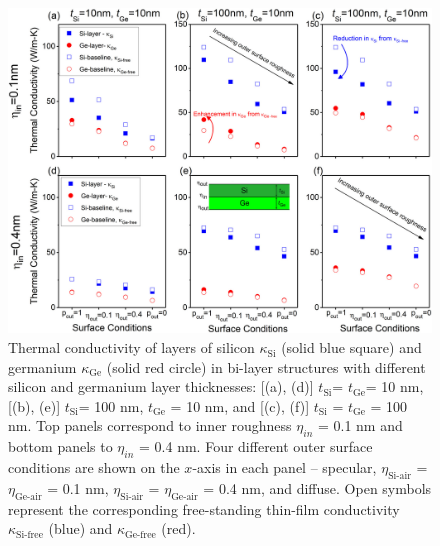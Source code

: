 \begin{figure}[hbt]
  \centering \includegraphics[width=1.0\textwidth]{figures/ch5/Fig4.jpg}
  \caption{Thermal conductivity of layers of silicon $\kappa_{\text{Si}}$ (solid blue square) and germanium $\kappa_{\text{Ge}}$ (solid red circle) in bi-layer structures with different silicon and germanium layer thicknesses: [(a), (d)] $t_{\text{Si}}$= $t_{\text{Ge}}$= 10 nm, [(b), (e)] $t_{\text{Si}}$= 100 nm, $t_{\text{Ge}}$ = 10 nm, and [(c), (f)] $t_{\text{Si}}$ = $t_{\text{Ge}}$ = 100 nm. Top panels correspond to inner roughness $\eta_{in}$ = 0.1 nm and bottom panels to $\eta_{in}$ = 0.4 nm. Four different outer surface conditions are shown on the $x$-axis in each panel -- specular, $\eta_{\text{Si-air}}$ = $\eta_{\text{Ge-air}}$  = 0.1 nm, $\eta_{\text{Si-air}}$ = $\eta_{\text{Ge-air}}$ = 0.4 nm, and diffuse. Open symbols represent the corresponding free-standing thin-film conductivity $\kappa_{\text{Si-free}}$ (blue) and $\kappa_{\text{Ge-free}}$ (red).}
    \label{fig:ch5-bilayer}
 \end{figure}
